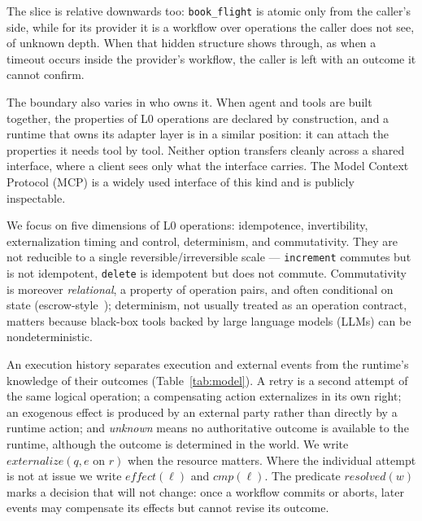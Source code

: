 \documentclass[runningheads]{comsis3}
\begin{document}
The slice is relative downwards too: \texttt{book\_flight} is atomic only
from the caller's side, while for its provider it is a workflow over
operations the caller does not see, of unknown depth. When that hidden
structure shows through, as when a timeout occurs inside the provider's workflow, the caller is left with an outcome it cannot confirm.

The boundary also varies in who owns it. When agent and tools are built
together, the properties of L0 operations are declared by construction, and
a runtime that owns its adapter layer is in a similar position: it can
attach the properties it needs tool by tool. Neither option transfers
cleanly across a shared interface, where a client sees only what the
interface carries. The Model Context Protocol
(MCP) is a widely used interface of this kind and is publicly inspectable.

We focus on five dimensions of L0 operations: idempotence, invertibility,
externalization timing and control, determinism, and commutativity. They are
not reducible to a single reversible/irreversible scale ---
\texttt{increment} commutes but is not idempotent, \texttt{delete} is
idempotent but does not commute. Commutativity is moreover
\emph{relational}, a property of operation pairs, and often conditional on
state (escrow-style~\cite{oneil1986escrow}); determinism, not usually
treated as an operation contract, matters because black-box tools backed by
large language models (LLMs)
can be nondeterministic.

An execution history separates execution and external events from the
runtime's knowledge of their outcomes (Table~\ref{tab:model}). A retry is a second
attempt of the same logical operation; a compensating action externalizes in
its own right; an exogenous effect is produced by an external party rather
than directly by a runtime action; and \emph{unknown} means no
authoritative outcome is available to the runtime, although the outcome is
determined in the world. We write $externalize(q, e \text{ on } r)$ when the
resource matters. Where the individual attempt is not at issue we
write $effect(\ell)$ and $cmp(\ell)$. The predicate $resolved(w)$ marks a
decision that will not change: once a workflow commits or aborts, later
events may compensate its effects but cannot revise its outcome.
\end{document}
